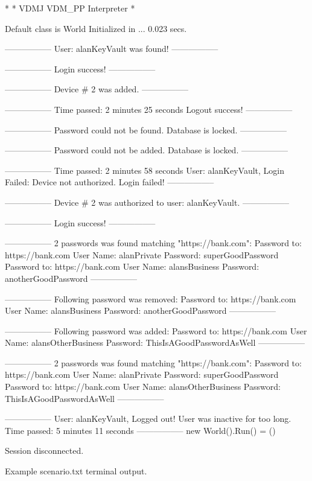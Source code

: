 \begin{longlisting}
    \begin{vdm_al}
*
* VDMJ VDM_PP Interpreter
*

Default class is World
Initialized in ... 0.023 secs.

-----------------
User: alanKeyVault was found!
-----------------

-----------------
Login success!
-----------------

-----------------
Device # 2 was added.
-----------------

-----------------
Time passed: 2 minutes 25 seconds
Logout success!
-----------------

-----------------
Password could not be found. Database is locked.
-----------------

-----------------
Password could not be added. Database is locked.
-----------------

-----------------
Time passed: 2 minutes 58 seconds
User: alanKeyVault, Login Failed: Device not authorized.
Login failed!
-----------------

-----------------
Device # 2 was authorized to user:
alanKeyVault.
-----------------

-----------------
Login success!
-----------------

-----------------
2 passwords was found matching "https://bank.com":
Password to: https://bank.com
User Name: alanPrivate
Password: superGoodPassword
Password to: https://bank.com
User Name: alansBusiness
Password: anotherGoodPassword
-----------------

-----------------
Following password was removed:
Password to: https://bank.com
User Name: alansBusiness
Password: anotherGoodPassword
-----------------

-----------------
Following password was added:
Password to: https://bank.com
User Name: alansOtherBusiness
Password: ThisIsAGoodPasswordAsWell
-----------------

-----------------
2 passwords was found matching "https://bank.com":
Password to: https://bank.com
User Name: alanPrivate
Password: superGoodPassword
Password to: https://bank.com
User Name: alansOtherBusiness
Password: ThisIsAGoodPasswordAsWell
-----------------

-----------------
User: alanKeyVault, Logged out! User was inactive for too long.
Time passed: 5 minutes 11 seconds
-----------------
new World().Run() = ()

Session disconnected.

    \end{vdm_al}
    \caption{Example {\ttfamily scenario.txt} terminal output.}
    \label{lst:test:scenario_output}
\end{longlisting}
